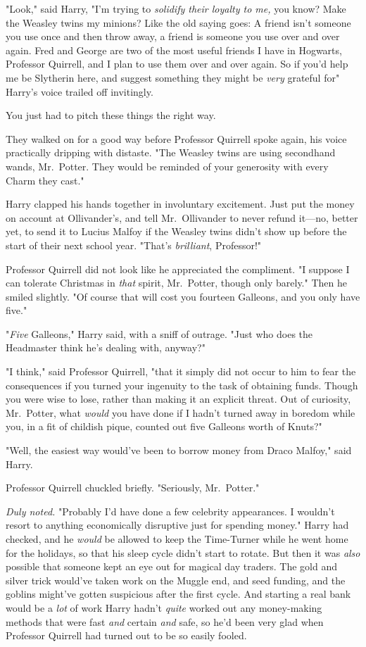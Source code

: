 "Look," said Harry, "I'm trying to \emph{solidify their loyalty to me,} you
know? Make the Weasley twins my minions? Like the old saying goes: A friend
isn't someone you use once and then throw away, a friend is someone you use
over and over again. Fred and George are two of the most useful friends I have
in Hogwarts, Professor Quirrell, and I plan to use them over and over again. So
if you'd help me be Slytherin here, and suggest something they might be
\emph{very} grateful for{\el}" Harry's voice trailed off invitingly.

You just had to pitch these things the right way.

They walked on for a good way before Professor Quirrell spoke again, his voice
practically dripping with distaste. "The Weasley twins are using secondhand
wands, Mr.~Potter. They would be reminded of your generosity with every Charm
they cast."

Harry clapped his hands together in involuntary excitement. Just put the money
on account at Ollivander's, and tell Mr.~Ollivander to never refund it—no,
better yet, to send it to Lucius Malfoy if the Weasley twins didn't show up
before the start of their next school year. "That's \emph{brilliant},
Professor!"

Professor Quirrell did not look like he appreciated the compliment. "I suppose
I can tolerate Christmas in \emph{that} spirit, Mr.~Potter, though only
barely." Then he smiled slightly. "Of course that will cost you fourteen
Galleons, and you only have five."

"\emph{Five} Galleons," Harry said, with a sniff of outrage. "Just who does the
Headmaster think he's dealing with, anyway?"

"I think," said Professor Quirrell, "that it simply did not occur to him to
fear the consequences if you turned your ingenuity to the task of obtaining
funds. Though you were wise to lose, rather than making it an explicit threat.
Out of curiosity, Mr.~Potter, what \emph{would} you have done if I hadn't
turned away in boredom while you, in a fit of childish pique, counted out five
Galleons worth of Knuts?"

"Well, the easiest way would've been to borrow money from Draco Malfoy," said
Harry.

Professor Quirrell chuckled briefly. "Seriously, Mr.~Potter."

\emph{Duly noted.} "Probably I'd have done a few celebrity appearances. I
wouldn't resort to anything economically disruptive just for spending money."
Harry had checked, and he \emph{would} be allowed to keep the Time-Turner while
he went home for the holidays, so that his sleep cycle didn't start to rotate.
But then it was \emph{also} possible that someone kept an eye out for magical
day traders. The gold and silver trick would've taken work on the Muggle end,
and seed funding, and the goblins might've gotten suspicious after the first
cycle. And starting a real bank would be a \emph{lot} of work{\el} Harry
hadn't \emph{quite} worked out any money-making methods that were fast
\emph{and} certain \emph{and} safe, so he'd been very glad when Professor
Quirrell had turned out to be so easily fooled.

